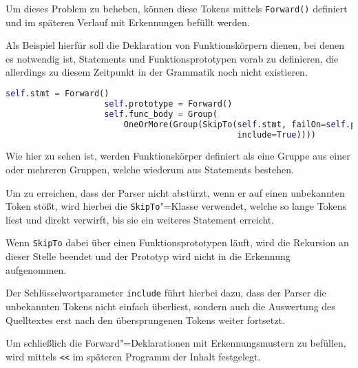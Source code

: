                 Um dieses Problem zu beheben,
                können diese Tokens mittels
                \lstinline{Forward()} definiert und
                im späteren Verlauf mit Erkennungen befüllt werden.

                Als Beispiel hierfür soll die Deklaration von Funktionskörpern dienen,
                bei denen es notwendig ist,
                Statements und
                Funktionsprototypen vorab zu definieren,
                die allerdings zu diesem Zeitpunkt in der Grammatik noch nicht existieren.

                \begin{lstlisting}[caption={Definition der Erkennung von Funktionskörpern}, gobble=20, language=python]
                    self.stmt = Forward()
                    self.prototype = Forward()
                    self.func_body = Group(
                        OneOrMore(Group(SkipTo(self.stmt, failOn=self.prototype,
                                               include=True))))
                \end{lstlisting}

                Wie hier zu sehen ist,
                werden Funktionskörper definiert als eine Gruppe aus einer oder
                mehreren Gruppen,
                welche wiederum aus Statements bestehen.

                Um zu erreichen,
                dass der Parser nicht abstürzt,
                wenn er auf einen unbekannten Token stößt,
                wird hierbei die
                \lstinline{SkipTo}"=Klasse verwendet,
                welche so lange Tokens liest und
                direkt verwirft,
                bis sie ein weiteres Statement erreicht.

                Wenn
                \lstinline{SkipTo} dabei über einen Funktionsprototypen läuft,
                wird die Rekursion an dieser Stelle beendet und
                der Prototyp wird nicht in die Erkennung aufgenommen.

                Der Schlüsselwortparameter
                \lstinline{include} führt hierbei dazu,
                dass der Parser die unbekannten Tokens nicht einfach überliest,
                sondern auch die Auswertung des Quelltextes erst nach den übersprungenen Tokens weiter fortsetzt.

                Um schließlich die Forward"=Deklarationen mit Erkennungsmustern zu befüllen,
                wird mittels
                \lstinline{<<} im späteren Programm der Inhalt festgelegt.

